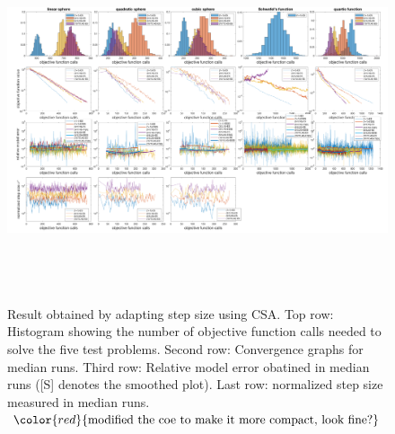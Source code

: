 \begin{center}
\begin{figure}
\includegraphics[height=4.2in, width=6in]{merged_plot_v4}
\caption{Result obtained by adapting step size using CSA. Top row: Histogram showing the number of objective function calls needed to solve the five test problems. Second row: Convergence graphs for median runs. Third row: Relative model error obatined in median runs ([S] denotes the smoothed plot). Last row: normalized step size measured in median runs. 
$\color{red}{\text{modified the coe to make it more compact, look fine?}}$}
\label{fig:merged_plot}
\end{figure}
\end{center}

